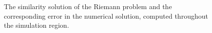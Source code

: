 \documentclass[12pt,letterpaper]{article}
\begin{document}
\begin{figure}[htbp]
   \centering
      \begin{subfigmatrix}{2}
      \end{subfigmatrix}
   \caption[The Similarity Solution of the Riemann Problem]{The similarity solution of the Riemann problem and the corresponding error in the numerical solution, computed throughout the simulation region.}
   \label{fig:riemann_similarity}
\end{figure}

   
\end{document}
